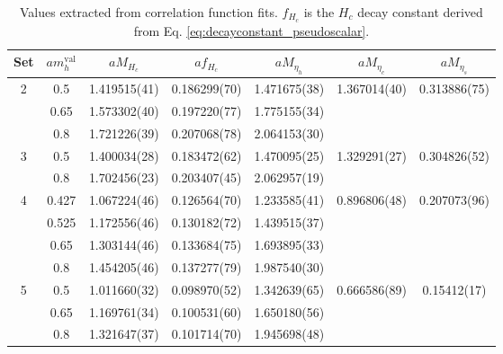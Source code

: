 \begin{table}
\begin{center}
\begin{tabular}{ c c c c c c c }
\hline
Set & $am_h^{\text{val}}$ & $aM_{H_c}$& $af_{H_c}$& $aM_{\eta_h}$& $aM_{\eta_c}$& $aM_{\eta_s}$\\ [0.5ex]
\hline
2 & 0.5 & 1.419515(41) & 0.186299(70) & 1.471675(38) & 1.367014(40) & 0.313886(75)\\ [0.5ex] 
 & 0.65 & 1.573302(40) & 0.197220(77) & 1.775155(34) & & \\ [0.5ex] 
 & 0.8 & 1.721226(39) & 0.207068(78) & 2.064153(30) & &\\ [0.5ex] 
\hline
3 & 0.5 & 1.400034(28) & 0.183472(62) & 1.470095(25) & 1.329291(27) & 0.304826(52)\\ [0.5ex] 
 & 0.8 & 1.702456(23) & 0.203407(45) & 2.062957(19) & & \\ [0.5ex] 
\hline
4 & 0.427 & 1.067224(46) & 0.126564(70) & 1.233585(41) & 0.896806(48) & 0.207073(96)\\ [0.5ex] 
 & 0.525 & 1.172556(46) & 0.130182(72) & 1.439515(37) & & \\ [0.5ex] 
 & 0.65 & 1.303144(46) & 0.133684(75) & 1.693895(33) & & \\ [0.5ex] 
 & 0.8 & 1.454205(46) & 0.137277(79) & 1.987540(30) & & \\ [0.5ex] 
\hline
5 & 0.5 & 1.011660(32) & 0.098970(52) & 1.342639(65) & 0.666586(89) & 0.15412(17)\\ [0.5ex] 
 & 0.65 & 1.169761(34) & 0.100531(60) & 1.650180(56) & & \\ [0.5ex] 
 & 0.8 & 1.321647(37) & 0.101714(70) & 1.945698(48) & & \\ [0.5ex] 
\hline
\end{tabular}
\caption{Values extracted from correlation function fits. $f_{H_c}$  is the $H_c$ decay constant derived from Eq. \eqref{eq:decayconstant_pseudoscalar}. \label{tab:results2_BsDsstar} }
\end{center}
\end{table}


